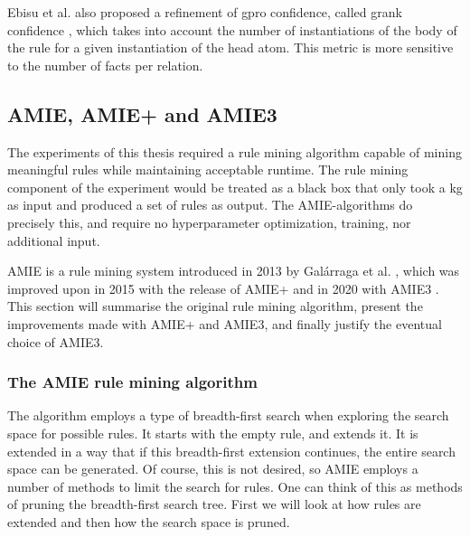 Ebisu et al. also proposed a refinement of \gls{gpro} confidence, called \gls{grank} confidence \cite{gpro}, which takes into account the number of instantiations of the body of the rule for a given instantiation of the head atom. This metric is more sensitive to the number of facts per relation.


\subsection{AMIE, AMIE+ and AMIE3}
\label{the_amies}
The experiments of this thesis required a rule mining algorithm capable of mining meaningful rules while maintaining acceptable runtime. The rule mining component of the experiment would be treated as a black box that only took a \gls{kg} as input and produced a set of rules as output. The AMIE-algorithms do precisely this, and require no hyperparameter optimization, training, nor additional input.

AMIE is a rule mining system introduced in 2013 by Galárraga et al. \cite{amie}, which was improved upon in 2015 with the release of AMIE+ \cite{amie_plus} and in 2020 with AMIE3 \cite{amie3}. This section will summarise the original rule mining algorithm, present the improvements made with AMIE+ and AMIE3, and finally justify the eventual choice of AMIE3.

\subsubsection{The AMIE rule mining algorithm}
The algorithm employs a type of breadth-first search when exploring the search space for possible rules. It starts with the empty rule, and extends it. It is extended in a way that if this breadth-first extension continues, the entire search space can be generated. Of course, this is not desired, so AMIE employs a number of methods to limit the search for rules. One can think of this as methods of pruning the breadth-first search tree.  First we will look at how rules are extended and then how the search space is pruned.


